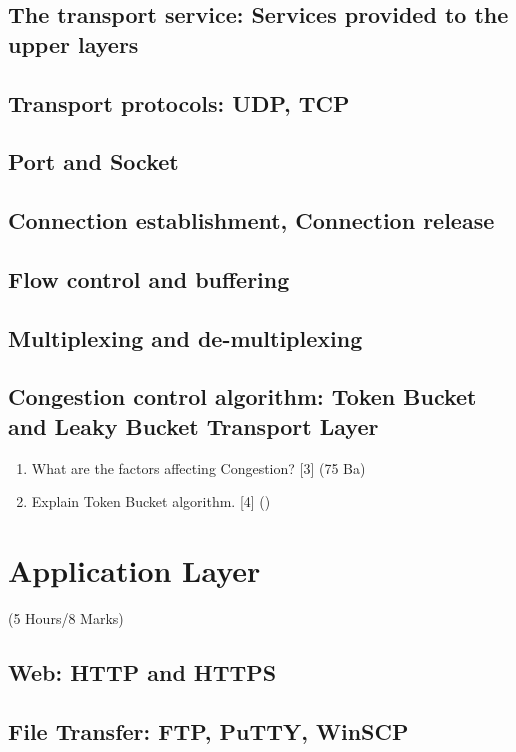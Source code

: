 \documentclass[12pt]{article}
\begin{document}
	\subsection{The transport service: Services provided to the upper layers}
	\subsection{Transport protocols: UDP, TCP}
	\subsection{Port and Socket}
	\subsection{Connection establishment, Connection release}
	\subsection{Flow control and buffering}
	\subsection{Multiplexing and de-multiplexing}
	\subsection{Congestion control algorithm: Token Bucket and Leaky Bucket Transport Layer}
		\begin{enumerate}
			\item What are the factors affecting Congestion? \hfill [3] (75 Ba)

			\item Explain Token Bucket algorithm. \hfill [4] ()
		\end{enumerate}

	\pagebreak

\section{Application Layer}
	\begin{center}(5 Hours/8 Marks)\end{center}
	\subsection{Web: HTTP and HTTPS}
	\subsection{File Transfer: FTP, PuTTY, WinSCP}
\end{document}
